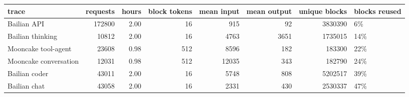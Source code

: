 \begin{tabular}{lrrrrrrl}
\toprule
trace & requests & hours & block tokens & mean input & mean output & unique blocks & blocks reused \\
\midrule
Bailian API & 172800 & 2.00 & 16 & 915 & 92 & 3830390 & 6\% \\
Bailian thinking & 10812 & 2.00 & 16 & 4763 & 3651 & 1735015 & 14\% \\
Mooncake tool-agent & 23608 & 0.98 & 512 & 8596 & 182 & 183300 & 22\% \\
Mooncake conversation & 12031 & 0.98 & 512 & 12035 & 343 & 182790 & 24\% \\
Bailian coder & 43011 & 2.00 & 16 & 5748 & 808 & 5202517 & 39\% \\
Bailian chat & 43058 & 2.00 & 16 & 2331 & 430 & 2530337 & 47\% \\
\bottomrule
\end{tabular}
